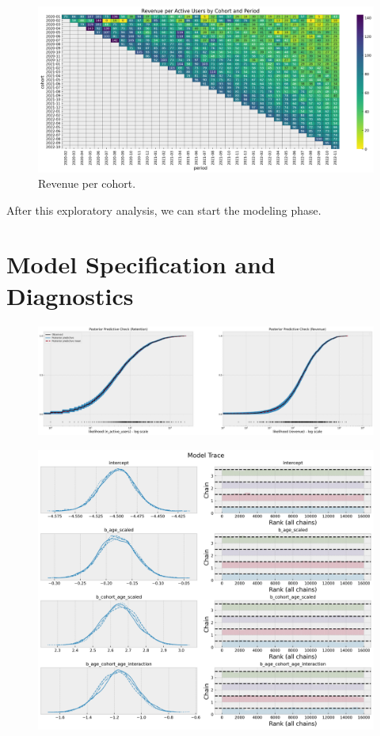 \documentclass[11pt]{amsart}
\begin{document}
\begin{figure}
    \centering
    \includegraphics[width=\textwidth]{images/revenue_retention_25_0.png}
    \caption{Revenue per cohort.}
    \label{fig:revenue_per_active_user}
\end{figure}

After this exploratory analysis, we can start the modeling phase.

\section{Model Specification and Diagnostics}

\begin{figure}
    \includegraphics[width=\textwidth]{images/revenue_retention_37_0.png}
\end{figure}

\begin{figure}
    \includegraphics[width=\textwidth]{images/revenue_retention_41_0.png}
\end{figure}
\end{document}
